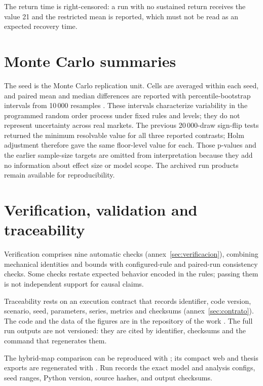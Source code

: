 The return time is right-censored: a run with no sustained return receives the value 21 and the restricted mean is reported, which must not be read as an expected recovery time.

\section{Monte Carlo summaries}
\label{sec:analisis-estadistico}

The seed is the Monte Carlo replication unit. Cells are averaged within each seed, and paired mean and median differences are reported with percentile-bootstrap intervals from 10\,000 resamples \cite{efron1979bootstrap}. These intervals characterize variability in the programmed random order process under fixed rules and levels; they do not represent uncertainty across real markets. The previous 20\,000-draw sign-flip tests returned the minimum resolvable value for all three reported contrasts; Holm adjustment therefore gave the same floor-level value for each. Those p-values and the earlier sample-size targets are omitted from interpretation because they add no information about effect size or model scope. The archived run products remain available for reproducibility.

\section{Verification, validation and traceability}

Verification comprises nine automatic checks (annex~\ref{sec:verificacion}), combining mechanical identities and bounds with configured-rule and paired-run consistency checks. Some checks restate expected behavior encoded in the rules; passing them is not independent support for causal claims.

Traceability rests on an execution contract that records identifier, code version, scenario, seed, parameters, series, metrics and checksums (annex~\ref{sec:contrato}). The code and the data of the figures are in the repository of the work \cite{calderon2026repository}. The full run outputs are not versioned: they are cited by identifier, checksums and the command that regenerates them.

The hybrid-map comparison can be reproduced with ; its compact web and thesis exports are regenerated with . Run \code{\HybridRunID} records the exact model and analysis configs, seed ranges, Python version, source hashes, and output checksums.
